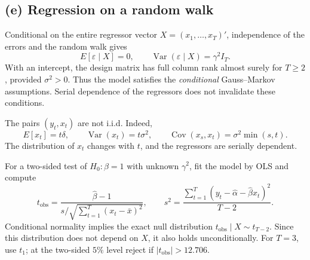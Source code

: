 \subsection*{(e) Regression on a random walk}
Conditional on the entire regressor vector $X=(x_1,\ldots,x_T)'$,
independence of the errors and the random walk gives
\[
E[\varepsilon\mid X]=0,\qquad
\operatorname{Var}(\varepsilon\mid X)=\gamma^2I_T.
\]
With an intercept, the design matrix has full column rank almost surely
for $T\geq2$, provided $\sigma^2>0$. Thus the model satisfies the
\emph{conditional} Gauss--Markov assumptions. Serial dependence of
the regressors does not invalidate these conditions.

The pairs $(y_t,x_t)$ are not i.i.d. Indeed,
\[
E[x_t]=t\delta,\qquad
\operatorname{Var}(x_t)=t\sigma^2,\qquad
\operatorname{Cov}(x_s,x_t)=\sigma^2\min(s,t).
\]
The distribution of $x_t$ changes with $t$, and the regressors are
serially dependent.

For a two-sided test of $H_0:\beta=1$ with unknown $\gamma^2$,
fit the model by OLS and compute
\[
t_{\mathrm{obs}}=
\frac{\widehat\beta-1}{s/\sqrt{\sum_{t=1}^T(x_t-\bar x)^2}},
\qquad
s^2=\frac{\sum_{t=1}^T
(y_t-\widehat\alpha-\widehat\beta x_t)^2}{T-2}.
\]
Conditional normality implies the exact null distribution
$t_{\mathrm{obs}}\mid X\sim t_{T-2}$. Since this distribution does not
depend on $X$, it also holds unconditionally.
For $T=3$, use $t_1$; at the two-sided $5\%$ level reject if
$|t_{\mathrm{obs}}|>12.706$.
